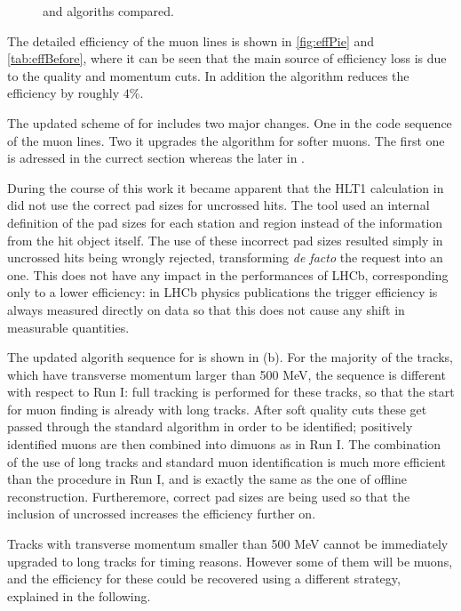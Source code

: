 \begin{figure}[h!]
  \centering
  \scalebox{1}{}
  \scalebox{1}{}
 \caption{ \runone and \runtwo \hltone algoriths compared. }
  \label{hlt1_algo_seq}
\end{figure}

The detailed efficiency of the \runone \hltone muon lines is shown in \autoref{fig:effPie} and \autoref{tab:effBefore},
where it can be seen that the main source of efficiency loss is due to the quality and momentum cuts.
In addition the \mvm algorithm reduces the efficiency by roughly $4\%$.

The updated scheme of \hltone for \runtwo includes two major changes.
One in the code sequence of the \hltone muon lines. Two it upgrades the \mvm algorithm for softer muons. The first one is adressed
in the currect section whereas the later in .

During the course of this work it became apparent that the HLT1  calculation in \runone
did not use the correct pad sizes for uncrossed hits.
The tool used an internal definition of the pad sizes for each station and
region instead of the information from the hit object itself.
The use of these incorrect pad sizes resulted simply in uncrossed hits being wrongly
rejected, transforming \emph{de facto} the  request into an  one.
This does not have any impact in the performances of LHCb, corresponding only to a lower efficiency:
in LHCb physics publications the trigger efficiency is always measured directly on data so that this
does not cause any shift in measurable quantities.

The updated \hltone algorith sequence for \runtwo is shown in (b).
For the majority of the tracks, which have transverse momentum larger than 500 MeV, the sequence is different with respect to
Run I:
full tracking is performed for these tracks, so that the start for muon finding is already with long tracks.
After soft quality cuts these get passed through the standard  algorithm in order to be identified;
positively identified muons are then combined into dimuons as in Run I.
The combination of the use of long tracks and standard muon identification is much more efficient than the
procedure in Run I, and is exactly the same as the one of offline reconstruction.
Furtheremore, correct pad sizes are being used so that the inclusion of uncrossed increases the efficiency further on.

Tracks with transverse momentum smaller than 500 MeV cannot be immediately upgraded to long tracks for timing reasons.
However some of them will be muons, and the efficiency for these could be recovered using a different strategy,
explained in the following.
